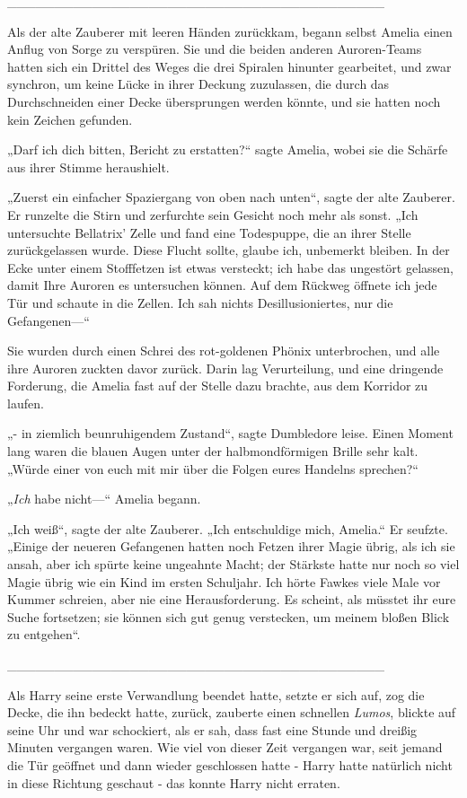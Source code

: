 {\_\_\_\_\_\_\_\_\_\_\_\_\_\_\_\_\_\_\_\_\_\_\_\_\_\_\_\_\_\_\_\_\_\_\_\_\_\_\_\_

Als der alte Zauberer mit leeren Händen zurückkam, begann selbst Amelia einen Anflug von Sorge zu verspüren. Sie und die beiden anderen Auroren-Teams hatten sich ein Drittel des Weges die drei Spiralen hinunter gearbeitet, und zwar synchron, um keine Lücke in ihrer Deckung zuzulassen, die durch das Durchschneiden einer Decke übersprungen werden könnte, und sie hatten noch kein Zeichen gefunden.

„Darf ich dich bitten, Bericht zu erstatten?“ sagte Amelia, wobei sie die Schärfe aus ihrer Stimme heraushielt.

„Zuerst ein einfacher Spaziergang von oben nach unten“, sagte der alte Zauberer. Er runzelte die Stirn und zerfurchte sein Gesicht noch mehr als sonst. „Ich untersuchte Bellatrix' Zelle und fand eine Todespuppe, die an ihrer Stelle zurückgelassen wurde. Diese Flucht sollte, glaube ich, unbemerkt bleiben. In der Ecke unter einem Stofffetzen ist etwas versteckt; ich habe das ungestört gelassen, damit Ihre Auroren es untersuchen können. Auf dem Rückweg öffnete ich jede Tür und schaute in die Zellen. Ich sah nichts Desillusioniertes, nur die Gefangenen—“

Sie wurden durch einen Schrei des rot-goldenen Phönix unterbrochen, und alle ihre Auroren zuckten davor zurück. Darin lag Verurteilung, und eine dringende Forderung, die Amelia fast auf der Stelle dazu brachte, aus dem Korridor zu laufen.

„- in ziemlich beunruhigendem Zustand“, sagte Dumbledore leise. Einen Moment lang waren die blauen Augen unter der halbmondförmigen Brille sehr kalt. „Würde einer von euch mit mir über die Folgen eures Handelns sprechen?“

„\emph{Ich} habe nicht—“ Amelia begann.

„Ich weiß“, sagte der alte Zauberer. „Ich entschuldige mich, Amelia.“ Er seufzte. „Einige der neueren Gefangenen hatten noch Fetzen ihrer Magie übrig, als ich sie ansah, aber ich spürte keine ungeahnte Macht; der Stärkste hatte nur noch so viel Magie übrig wie ein Kind im ersten Schuljahr. Ich hörte Fawkes viele Male vor Kummer schreien, aber nie eine Herausforderung. Es scheint, als müsstet ihr eure Suche fortsetzen; sie können sich gut genug verstecken, um meinem bloßen Blick zu entgehen“.

\_\_\_\_\_\_\_\_\_\_\_\_\_\_\_\_\_\_\_\_\_\_\_\_\_\_\_\_\_\_\_\_\_\_\_\_\_\_\_\_

Als Harry seine erste Verwandlung beendet hatte, setzte er sich auf, zog die Decke, die ihn bedeckt hatte, zurück, zauberte einen schnellen \emph{Lumos}, blickte auf seine Uhr und war schockiert, als er sah, dass fast eine Stunde und dreißig Minuten vergangen waren. Wie viel von dieser Zeit vergangen war, seit jemand die Tür geöffnet und dann wieder geschlossen hatte - Harry hatte natürlich nicht in diese Richtung geschaut - das konnte Harry nicht erraten.

}

